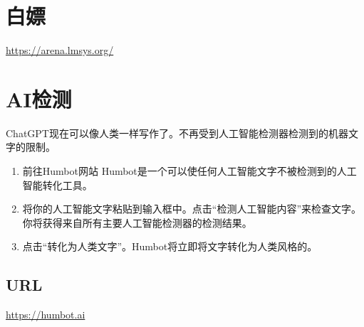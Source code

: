 \documentclass[11pt]{article}
\begin{document}
\section{白嫖}
\label{sec:org3c997bf}
\url{https://arena.lmsys.org/}

\section{AI检测}
\label{sec:orgef3b883}
ChatGPT现在可以像人类一样写作了。不再受到人工智能检测器检测到的机器文字的限制。
\begin{enumerate}
\item 前往Humbot网站
Humbot是一个可以使任何人工智能文字不被检测到的人工智能转化工具。
\item 将你的人工智能文字粘贴到输入框中。点击“检测人工智能内容”来检查文字。你将获得来自所有主要人工智能检测器的检测结果。
\item 点击“转化为人类文字”。Humbot将立即将文字转化为人类风格的。
\end{enumerate}
\subsection{URL}
\label{sec:org430f9f6}
\url{https://humbot.ai}
\end{document}
